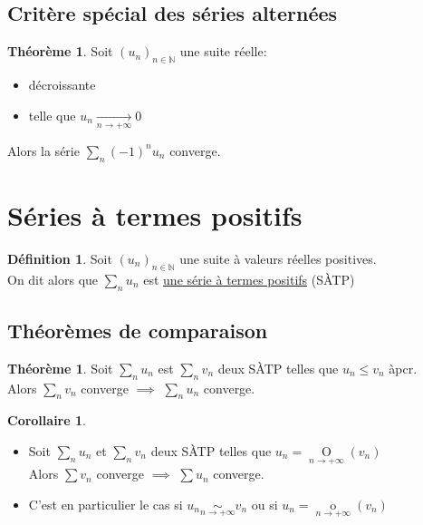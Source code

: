 \documentclass[10pt,a4paper]{article}
\theoremstyle{definition}
\newtheorem{theorem}[proposition]{Théorème}
\newtheorem{corollaire}[proposition]{Corollaire}
\newtheorem{definition}[proposition]{Définition}
\DeclareMathOperator*{\negl}{o}
\DeclareMathOperator*{\dom}{O}
\DeclareMathOperator*{\eqv}{\sim}
\begin{document}
\subsection{Critère spécial des séries alternées}
\begin{theorem}
Soit $(u_n)_{n \in \mathbb{N}}$ une suite réelle:
\begin{itemize}
\item décroissante
\item telle que $u_n \xrightarrow[n \to +\infty]{} 0$
\end{itemize}
Alors la série $\sum\limits_n (-1)^n u_n$ converge.
\end{theorem}

\section{Séries à termes positifs}
\begin{definition}
Soit $(u_n)_{n \in \mathbb{N}}$ une suite à valeurs réelles positives. \\
On dit alors que $\sum\limits_n u_n$ est \uline{une série à termes positifs} (SÀTP)
\end{definition}

\subsection{Théorèmes de comparaison}
\begin{theorem}
Soit $\sum\limits_n u_n$ est $\sum\limits_n v_n$ deux SÀTP telles que $u_n \leq v_n$ àpcr. \\
Alors $\sum\limits_n v_n$ converge $\implies$ $\sum\limits_n u_n$ converge. 
\end{theorem}
\begin{corollaire}
\hfill
\begin{itemize}
\item Soit $\sum\limits_n u_n$ et $\sum\limits_n v_n$ deux SÀTP telles que $u_n = \dom\limits_{n \to +\infty} (v_n)$ \\
Alors $\sum v_n$ converge $\implies$ $\sum u_n$ converge.
\item C'est en particulier le cas si $u_n \eqv\limits_{n \to +\infty} v_n$ ou si $u_n = \negl\limits_{n \to +\infty} (v_n)$
\end{itemize}
\end{corollaire}
\end{document}
